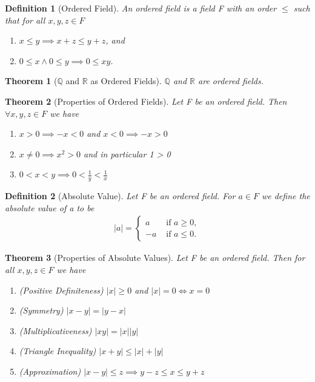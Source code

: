 \documentclass[11pt, oneside]{book}
\theoremstyle{break}
\newtheorem{thm}{Theorem}[section]
\newtheorem{defn}{Definition}[section]
\newcommand{\bb}[1]{\mathbb{#1}}		%
\begin{document}
\begin{defn}[Ordered Field]
	An ordered field is a field F with an order $\leq$ such that for all $x ,y ,z \in F$
	\begin{enumerate}
		\item $x \leq y \implies x + z \leq y + z$, and
		\item $0 \leq x \land 0 \leq y \implies 0 \leq xy$.
	\end{enumerate}
\end{defn}

\begin{thm}[$\bb{Q}$ and $\bb{R}$ as Ordered Fields]
	$\bb{Q}$ and $\bb{R}$ are ordered fields.
\end{thm}

\begin{thm}[Properties of Ordered Fields]
	Let F be an ordered field. Then $\forall x, y, z \in F$ we have
	\begin{enumerate}
		\item $x > 0 \implies -x < 0$ and $x < 0 \implies -x > 0$
		\item $x \neq 0 \implies x^2 > 0$ and in particular 1 > 0
		\item $0 < x < y \implies 0 < \frac{1}{y} < \frac{1}{x}$
	\end{enumerate}
\end{thm}

\begin{defn}[Absolute Value]
	Let F be an ordered field. For $a \in F$ we define the absolute value of a to be
	\begin{gather*}
		|a| =
		\begin{cases}
			 a & \text{ if } a \geq 0, \\
			-a & \text{ if } a \leq 0.
		\end{cases}
	\end{gather*}
\end{defn}

\begin{thm}[Properties of Absolute Values]
	Let F be an ordered field. Then for all $x, y, z \in F$ we have
	\begin{enumerate}
		\item (Positive Definiteness) $|x| \geq 0$ and $|x| = 0 \iff x = 0$
		\item (Symmetry) $|x - y| = |y - x|$
		\item (Multiplicativeness) $|xy| = |x||y|$
		\item (Triangle Inequality) $|x + y| \leq |x| + |y|$
		\item (Approximation) $|x - y| \leq z \implies y - z \leq x \leq y + z$
	\end{enumerate}
\end{thm}
\end{document}

